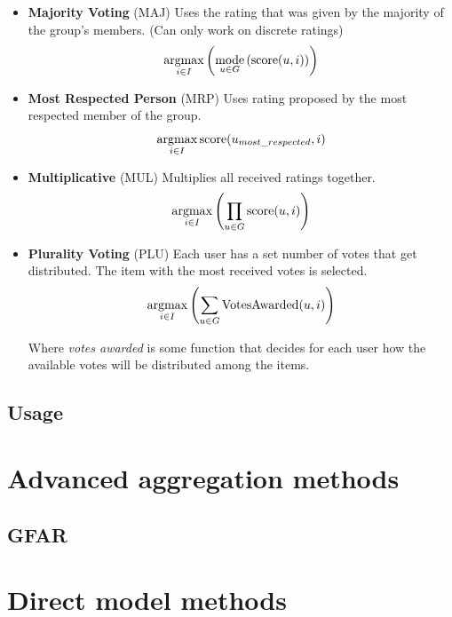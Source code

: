 \begin{itemize}
    \item \textbf{Majority Voting} (MAJ)\newline
        Uses the rating that was given by the majority of the group's members. (Can only work on discrete ratings)
        \begin{equation}
            \operatorname*{argmax}_{i \in I}{\left(\operatorname*{mode}_{u \in G}{\left(\textrm{score}(u,i)\right)}\right)}
        \end{equation}
    
    \item \textbf{Most Respected Person} (MRP)\newline
        Uses rating proposed by the most respected member of the group.
        \begin{equation}
            \operatorname*{argmax}_{i \in I}{\textrm{score}(u_{most\_respected},i)}
        \end{equation}
        
        
    \item \textbf{Multiplicative} (MUL)\newline
        Multiplies all received ratings together.
        \begin{equation}
            \operatorname*{argmax}_{i \in I}{\left(\prod_{u \in G}{\textrm{score}(u,i)}\right)}
        \end{equation}
        
        
    \item \textbf{Plurality Voting} (PLU)\newline
        Each user has a set number of votes that get distributed. The item with the most received votes is selected.
        \begin{equation}
            \operatorname*{argmax}_{i \in I}{\left(\sum_{u \in G}{\textrm{VotesAwarded}(u,i)}\right)}
        \end{equation}
        
        Where \textit{votes awarded} is some function that decides for each user how the available votes will be distributed among the items.
        
\end{itemize}
\subsection{Usage}

\section{Advanced aggregation methods}\label{sec:03_advanced_aggregation_methods}
\subsection{GFAR}

\section{Direct model methods}